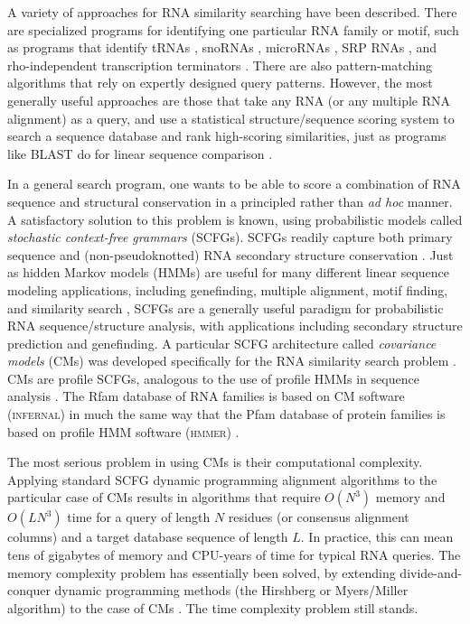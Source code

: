 \documentclass[11pt]{article}
\begin{document}
A variety of approaches for RNA similarity searching have been
described. There are specialized programs for identifying one
particular RNA family or motif, such as programs that identify tRNAs
\cite{LoweEddy97,Laslett04}, snoRNAs \cite{LoweEddy99,Schattner06},
microRNAs \cite{Lai03, Lim03}, SRP RNAs \cite{Regalia02}, and
rho-independent transcription terminators \cite{Ermolaeva00}. There
are also pattern-matching algorithms \cite{Macke01,Gautheret01} that
rely on expertly designed query patterns. However, the most generally
useful approaches are those that take any RNA (or any multiple RNA
alignment) as a query, and use a statistical structure/sequence
scoring system to search a sequence database and rank high-scoring
similarities, just as programs like BLAST do for linear sequence
comparison \cite{Altschul97}.

In a general search program, one wants to be able to score a
combination of RNA sequence and structural conservation in a
principled rather than \emph{ad hoc} manner. A satisfactory solution
to this problem is known, using probabilistic models called
\emph{stochastic context-free grammars} (SCFGs). SCFGs readily capture
both primary sequence and (non-pseudoknotted) RNA secondary structure
conservation \cite{Sakakibara94c,Durbin98}. Just as hidden Markov
models (HMMs) are useful for many different linear sequence modeling
applications, including genefinding, multiple alignment, motif
finding, and similarity search \cite{Durbin98}, SCFGs are a generally
useful paradigm for probabilistic RNA sequence/structure analysis,
with applications including secondary structure prediction and
genefinding. A particular SCFG architecture called \emph{covariance
models} (CMs) was developed specifically for the RNA similarity search
problem \cite{Eddy94}.  CMs are profile SCFGs, analogous to the use of
profile HMMs in sequence analysis \cite{Eddy94,Eddy02b}.  The Rfam
database of RNA families \cite{Griffiths-Jones05} is based on CM
software (\textsc{infernal}) in much the same way that the Pfam
database of protein families is based on profile HMM software
(\textsc{hmmer}) \cite{Sonnhammer98,Finn06}.

The most serious problem in using CMs is their computational
complexity. Applying standard SCFG dynamic programming alignment
algorithms to the particular case of CMs results in algorithms that
require $O(N^3)$ memory and $O(L N^3)$ time for a query of length $N$
residues (or consensus alignment columns) and a target database
sequence of length $L$.  In practice, this can mean tens of gigabytes
of memory and CPU-years of time for typical RNA queries. The memory
complexity problem has essentially been solved, by extending
divide-and-conquer dynamic programming methods (the Hirshberg or
Myers/Miller algorithm) to the case of CMs \cite{Eddy02b}. The time
complexity problem still stands.
\end{document}
